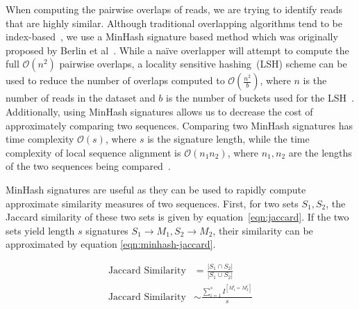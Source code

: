 \documentclass[11pt]{article}
\theoremstyle{plain}
\begin{document}
When computing the pairwise overlaps of reads, we are trying to identify reads that are highly
similar. Although traditional overlapping algorithms tend to be index-based~\cite{myers14}, we
use a MinHash signature based method which was originally proposed by Berlin et al~\cite{berlin14}.
While a na\"{i}ve overlapper will attempt to compute the full $\mathcal{O}(n^2)$ pairwise overlaps,
a locality sensitive hashing~(LSH) scheme can be used to reduce the number of overlaps computed to
$\mathcal{O}(\frac{n^2}{b})$, where $n$ is the number of reads in the dataset and $b$ is the number of
buckets used for the LSH~\cite{leskovec14}. Additionally, using MinHash signatures allows us to
decrease the cost of approximately comparing two sequences. Comparing two MinHash signatures has
time complexity $\mathcal{O}(s)$, where $s$ is the signature length, while the time complexity of
local sequence alignment is $\mathcal{O}(n_1 n_2)$, where $n_1, n_2$ are the lengths of the two
sequences being compared~\cite{smith81}.

MinHash signatures are useful as they can be used to rapidly compute approximate similarity
measures of two sequences. First, for two sets $S_1, S_2$, the Jaccard similarity of these
two sets is given by equation~\eqref{eqn:jaccard}. If the two sets yield length $s$ signatures
$S_1 \rightarrow M_1, S_2 \rightarrow M_2$, their similarity can be approximated by equation
\eqref{eqn:minhash-jaccard}.

\begin{align}
\label{eqn:jaccard}
\text{Jaccard Similarity} &= \frac{| S_1 \cap S_2 |}{| S_1 \cup S_2 |} \\
\label{eqn:minhash-jaccard}
\text{Jaccard Similarity} &\sim \frac{\sum_{i = 1}^s I^{[M_1^i = M_2^i]}}{s} 
\end{align}
\end{document}
